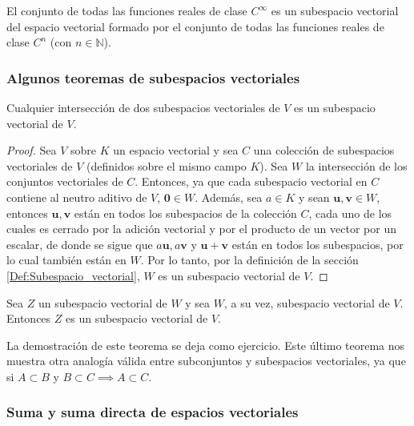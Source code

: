\documentclass[apuntes]{subfiles}
\begin{document}
\vspace{3mm}

El conjunto de todas las funciones reales de clase $C^{\infty}$ es un subespacio vectorial del espacio vectorial formado por el conjunto de todas las funciones reales de clase $C^n$ (con $n\in\mathbb{N}$).

\vspace{3mm}

\subsubsection*{Algunos teoremas de subespacios vectoriales} \label{Teo:Subespacios_vectoriales}

\begin{teo}\label{teo-2.1} Cualquier intersección de dos subespacios vectoriales de $V$ es un subespacio vectorial de $V$.

\begin{proof}
    Sea $V$ sobre $K$ un espacio vectorial y sea $C$ una colección de subespacios vectoriales de $V$ (definidos sobre el mismo campo $K$). Sea $W$ la intersección de los conjuntos vectoriales de $C$. Entonces, ya que cada subespacio vectorial en $C$ contiene al neutro aditivo de $V$, $\mathbf{0}\in W$. Además, sea $a\in K$ y sean $\mathbf{u},\mathbf{v}\in W$, entonces $\mathbf{u},\mathbf{v}$ están en todos los subespacios de la colección $C$, cada uno de los cuales es cerrado por la adición vectorial y por el producto de un vector por un escalar, de donde se sigue que $a\mathbf{u}, a\mathbf{v}$ y $\mathbf{u}+\mathbf{v}$ están en todos los subespacios, por lo cual también están en $W$. Por lo tanto, por la definición de la sección \ref{Def:Subespacio_vectorial}, $W$ es un subespacio vectorial de $V$.
\end{proof}
\end{teo}

\begin{teo}\label{teo-2.2} Sea $Z$ un subespacio vectorial de $W$ y sea $W$, a su vez, subespacio vectorial de $V$. Entonces $Z$ es un subespacio vectorial de $V$.
\end{teo}

\noindent La demostración de este teorema se deja como ejercicio. Este último teorema nos muestra otra analogía válida entre subconjuntos y subespacios vectoriales, ya que si $A \subset B$ y $B\subset C \implies A\subset C$.

\subsubsection*{Suma y suma directa de espacios vectoriales}
\end{document}

